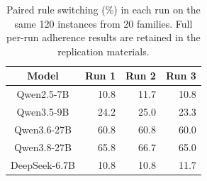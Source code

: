 \begin{table}[!htbp]
\centering
\caption{Paired rule switching (\%) in each run on the same 120 instances from 20 families. Full per-run adherence results are retained in the replication materials.}
\label{tab:semantic-repeats}
\small
\begin{tabular}{crrr}
\toprule
Model & Run 1 & Run 2 & Run 3 \\
\midrule
Qwen2.5-7B & 10.8 & 11.7 & 10.8 \\
Qwen3.5-9B & 24.2 & 25.0 & 23.3 \\
Qwen3.6-27B & 60.8 & 60.8 & 60.0 \\
Qwen3.8-27B & 65.8 & 66.7 & 65.0 \\
DeepSeek-6.7B & 10.8 & 10.8 & 11.7 \\
\bottomrule
\end{tabular}
\end{table}
